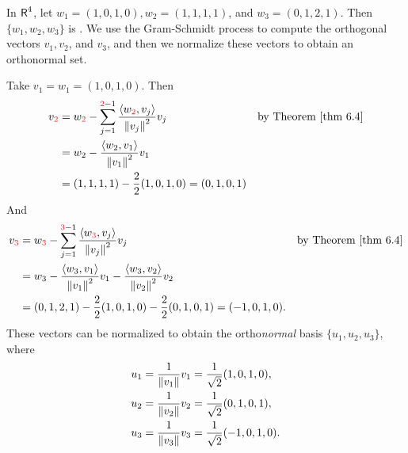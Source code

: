 \begin{example} \label{example 6.2.4}
In \(\textsf{R}^4\), let \(w_1 = (1, 0, 1, 0), w_2 = (1, 1, 1, 1)\), and \(w_3 = (0, 1, 2, 1)\).
Then \(\{ w_1, w_2, w_3 \}\) is \LID{}.
We use the Gram-Schmidt process to compute the orthogonal vectors \(v_1, v_2\), and \(v_3\), and then we normalize these vectors to obtain an orthonormal set.

Take \(v_1 = w_1 = (1, 0, 1, 0)\).
Then
\begin{align*}
    v_{\RED{2}} & = w_{\RED{2}} - \sum_{j = 1}^{\RED{2} - 1} \frac{\LG w_{\RED{2}}, v_j \RG}{\norm{v_j}^2} v_j & \text{by \THM{6.4}} \\
        & = w_2 - \frac{\LG w_2, v_1 \RG}{\norm{v_1}^2} v_1 \\
        & = (1, 1, 1, 1) - \frac{2}{2}(1, 0, 1, 0) = (0, 1, 0, 1)
\end{align*}
And
\begin{align*}
    v_{\RED{3}} & = w_{\RED{3}} - \sum_{j = 1}^{\RED{3} - 1} \frac{\LG w_{\RED{3}}, v_j \RG}{\norm{v_j}^2} v_j & \text{by \THM{6.4}} \\
        & = w_3 - \frac{\LG w_3, v_1 \RG}{\norm{v_1}^2} v_1 - \frac{\LG w_3, v_2 \RG}{\norm{v_2}^2} v_2 \\
        & = (0, 1, 2, 1) - \frac{2}{2} (1, 0, 1, 0) - \frac{2}{2} (0, 1, 0, 1) = (-1, 0, 1, 0).
\end{align*}
These vectors can be normalized to obtain the ortho\emph{normal} basis \(\{ u_1, u_2, u_3 \}\), where
\begin{align*}
    u_1 & = \frac{1}{\left\lVert v_1\right\rVert} v_1 = \frac{1}{\sqrt{2}}(1, 0, 1, 0), \\
    u_2 & = \frac{1}{\left\lVert v_2\right\rVert} v_2 = \frac{1}{\sqrt{2}}(0, 1, 0, 1), \\
    u_3 & = \frac{1}{\left\lVert v_3\right\rVert} v_3 = \frac{1}{\sqrt{2}}(-1, 0, 1, 0).
\end{align*}
\end{example}

